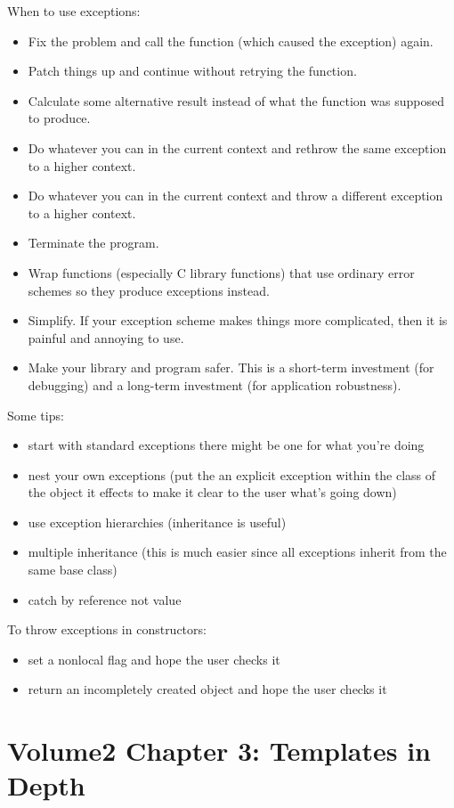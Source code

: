 \documentclass[12pt]{article}
\begin{document}
When to use exceptions:
\begin{itemize}
    \item Fix the problem and call the function (which caused the exception) again.
    \item Patch things up and continue without retrying the function.
    \item Calculate some alternative result instead of what the function was supposed to produce.
    \item Do whatever you can in the current context and rethrow the same exception to a higher context.
    \item Do whatever you can in the current context and throw a different exception to a higher context.
    \item Terminate the program.
    \item Wrap functions (especially C library functions) that use ordinary error schemes so they produce exceptions instead.
    \item Simplify. If your exception scheme makes things more complicated, then it is painful and annoying to use.
    \item Make your library and program safer. This is a short-term investment (for debugging) and a long-term investment (for application robustness).
\end{itemize}

Some tips:
\begin{itemize}
    \item start with standard exceptions there might be one for what you're doing
    \item nest your own exceptions (put the an explicit exception within the class of the object it effects to make it clear to the user what's going down)
    \item use exception hierarchies (inheritance is useful)
    \item multiple inheritance (this is much easier since all exceptions inherit from the same base class)
    \item catch by reference not value
\end{itemize}

To throw exceptions in constructors:
\begin{itemize}
    \item set a nonlocal flag and hope the user checks it
    \item return an incompletely created object and hope the user checks it
\end{itemize}

\section*{Volume2 Chapter 3: Templates in Depth}
\end{document}
